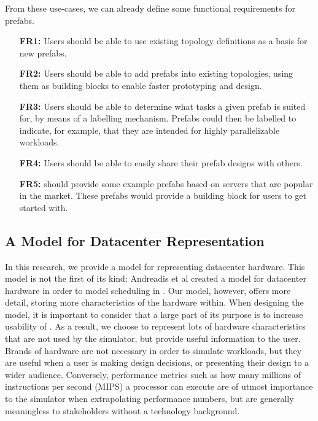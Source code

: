 \documentclass[11pt]{article}
\begin{document}
		From these use-cases, we can already define some functional requirements for prefabs.
		\begin{itemize}
			\item [\textbf{FR1:}] Users should be able to use existing topology definitions as a basis for new prefabs.
			\item [\textbf{FR2:}] Users should be able to add prefabs into existing topologies, using them as building blocks to enable faster prototyping and design.
			\item [\textbf{FR3:}] Users should be able to determine what tasks a given prefab is suited for, by means of a labelling mechanism. Prefabs could then be labelled to indicate, for example, that they are intended for highly parallelizable workloads.
			\item [\textbf{FR4:}] Users should be able to easily share their prefab designs with others.
			\item [\textbf{FR5:}] \opendc{} should provide some example prefabs based on servers that are popular in the market. These prefabs would provide a building block for users to get started with.
		\end{itemize}


	\subsection{A Model for Datacenter Representation}
		In this research, we provide a model for representing datacenter hardware. 
		This model is not the first of its kind: Andreadis et al created a model for datacenter hardware in order to model scheduling in \opendc{} \cite{Andreadis2018}. 
		Our model, however, offers more detail, storing more characteristics of the hardware within.
		When designing the model, it is important to consider that a large part of its purpose is to increase usability of \opendc{}. 
		As a result, we choose to represent lots of hardware characteristics that are not used by the simulator, but provide useful information to the user. 
		Brands of hardware are not necessary in order to simulate workloads, but they are useful when a user is making design decisions, or presenting their design to a wider audience.
		Conversely, performance metrics such as how many millions of instructions per second (MIPS) a processor can execute are of utmost importance to the simulator when extrapolating performance numbers, but are generally meaningless to stakeholders without a technology background.
	
\end{document}
